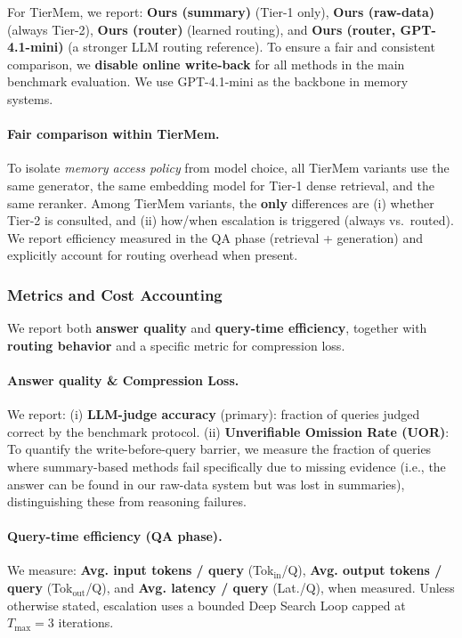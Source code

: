 \documentclass{article}
\theoremstyle{plain}
\theoremstyle{definition}
\theoremstyle{remark}
\begin{document}
For TierMem, we report:
\textbf{Ours (summary)} (Tier-1 only),
\textbf{Ours (raw-data)} (always Tier-2),
\textbf{Ours (router)} (learned routing),
and \textbf{Ours (router, GPT-4.1-mini)} (a stronger LLM routing reference). To ensure a fair and consistent comparison, we \textbf{disable online write-back} for all methods in the main benchmark evaluation. We use GPT-4.1-mini as the backbone in memory systems.

\paragraph{Fair comparison within TierMem.}
To isolate \emph{memory access policy} from model choice, all TierMem variants use the same generator, the same embedding model for Tier-1 dense retrieval, and the same reranker.
Among TierMem variants, the \textbf{only} differences are (i) whether Tier-2 is consulted, and (ii) how/when escalation is triggered (always vs.\ routed).
We report efficiency measured in the QA phase (retrieval + generation) and explicitly account for routing overhead when present.

\subsubsection{Metrics and Cost Accounting}
\label{sec:metrics}
We report both \textbf{answer quality} and \textbf{query-time efficiency}, together with \textbf{routing behavior} and a specific metric for compression loss.

\paragraph{Answer quality \& Compression Loss.}
We report:
(i) \textbf{LLM-judge accuracy} (primary): fraction of queries judged correct by the benchmark protocol.
(ii) \textbf{Unverifiable Omission Rate (UOR)}: To quantify the write-before-query barrier, we measure the fraction of queries where summary-based methods fail specifically due to missing evidence (i.e., the answer can be found in our raw-data system but was lost in summaries), distinguishing these from reasoning failures.

\paragraph{Query-time efficiency (QA phase).}
We measure:
\textbf{Avg. input tokens / query} (Tok$_{\text{in}}$/Q),
\textbf{Avg. output tokens / query} (Tok$_{\text{out}}$/Q),
and \textbf{Avg. latency / query} (Lat./Q), when measured.
Unless otherwise stated, escalation uses a bounded Deep Search Loop capped at $T_{\max}{=}3$ iterations.
\end{document}
